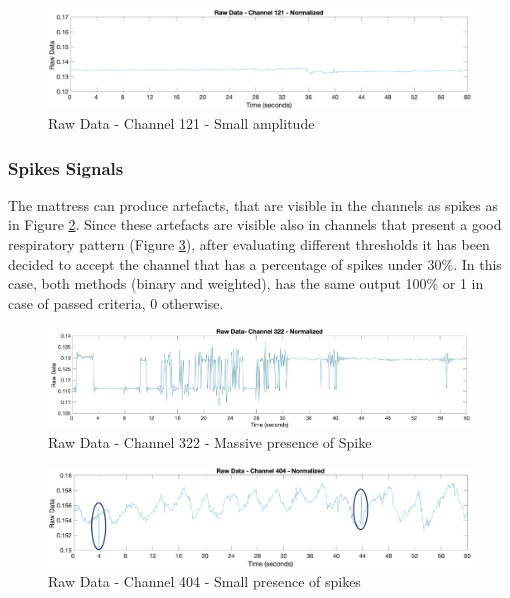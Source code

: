 \begin{figure}[H]
    \centering
    \includegraphics[width=\textwidth]{img/noisy.pdf}
    \caption{Raw Data - Channel 121 - Small amplitude}
    \label{fig:noisy}
\end{figure}


\subsubsection{Spikes Signals} \label{spikes}
The mattress can produce artefacts, that are visible in the channels as spikes as in Figure \ref{fig:spikeTotal}. 
Since these artefacts are visible also in channels that present a good respiratory pattern (Figure \ref{fig:goodSignal}), after evaluating different thresholds it has been decided to accept the channel that has a percentage of spikes under 30\%. In this case, both methods (binary and weighted), has the same output 100\% or 1 in case of passed criteria, 0 otherwise.\\


\begin{figure}[H]
    \centering
    \includegraphics[width=\textwidth]{img/spike_total.pdf}
    \caption{Raw Data - Channel 322 - Massive presence of Spike}
    \label{fig:spikeTotal}
\end{figure}

\begin{figure}[H]
    \centering
    \includegraphics[width=\textwidth]{img/goodSpikes.pdf}
    \caption{Raw Data - Channel 404 - Small presence of spikes}
    \label{fig:goodSignal}
\end{figure}

